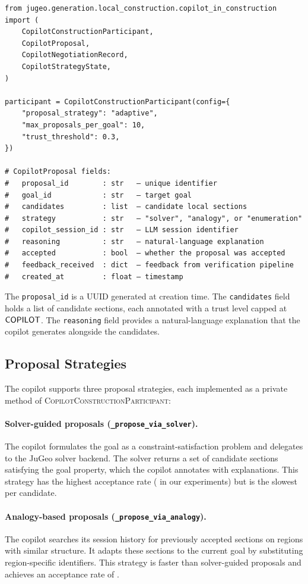 \documentclass[11pt]{article}
\newcommand{\CCP}{\textsc{CopilotConstructionParticipant}}
\begin{document}
\begin{lstlisting}
from jugeo.generation.local_construction.copilot_in_construction import (
    CopilotConstructionParticipant,
    CopilotProposal,
    CopilotNegotiationRecord,
    CopilotStrategyState,
)

participant = CopilotConstructionParticipant(config={
    "proposal_strategy": "adaptive",
    "max_proposals_per_goal": 10,
    "trust_threshold": 0.3,
})

# CopilotProposal fields:
#   proposal_id        : str   — unique identifier
#   goal_id            : str   — target goal
#   candidates         : list  — candidate local sections
#   strategy           : str   — "solver", "analogy", or "enumeration"
#   copilot_session_id : str   — LLM session identifier
#   reasoning          : str   — natural-language explanation
#   accepted           : bool  — whether the proposal was accepted
#   feedback_received  : dict  — feedback from verification pipeline
#   created_at         : float — timestamp
\end{lstlisting}

The \texttt{proposal\_id} is a UUID generated at creation time.  The
\texttt{candidates} field holds a list of candidate sections, each
annotated with a trust level capped at $\mathsf{COPILOT}$.  The
\texttt{reasoning} field provides a natural-language explanation that
the copilot generates alongside the candidates.

\subsection{Proposal Strategies}\label{sec:proto-strategies}

The copilot supports three proposal strategies, each implemented as a
private method of \CCP{}:

\paragraph{Solver-guided proposals (\texttt{\_propose\_via\_solver}).}
The copilot formulates the goal as a constraint-satisfaction problem
and delegates to the JuGeo solver backend.  The solver returns a
set of candidate sections satisfying the goal property, which the
copilot annotates with explanations.  This strategy has the highest
acceptance rate (\ppLXXXVIsolverAcceptRate{} in our experiments) but
is the slowest per candidate.

\paragraph{Analogy-based proposals (\texttt{\_propose\_via\_analogy}).}
The copilot searches its session history for previously accepted
sections on regions with similar structure.  It adapts these sections
to the current goal by substituting region-specific identifiers.
This strategy is faster than solver-guided proposals and achieves
an acceptance rate of \ppLXXXVIanalogyAcceptRate{}.
\end{document}
